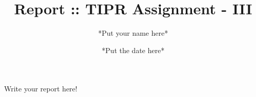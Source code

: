 \documentclass{article}
\title{Report :: TIPR Assignment - III}
\author{*Put your name here*}
\date{*Put the date here*}
\begin{document}
\maketitle

Write your report here!
\end{document}

